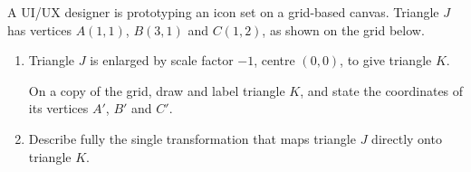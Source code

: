 \begin{question}
\noindent A UI/UX designer is prototyping an icon set on a grid-based canvas. Triangle $J$ has vertices $A(1,1)$, $B(3,1)$ and $C(1,2)$, as shown on the grid below.

\begin{center}
\end{center}

\begin{enumerate}
    \item[(a)] Triangle $J$ is enlarged by scale factor $-1$, centre $(0,0)$, to give triangle $K$.

    On a copy of the grid, draw and label triangle $K$, and state the coordinates of its vertices $A'$, $B'$ and $C'$.

    \vspace{4cm}

    \item[(b)] Describe fully the single transformation that maps triangle $J$ directly onto triangle $K$.

    \vspace{3cm}
\end{enumerate}
\end{question}
